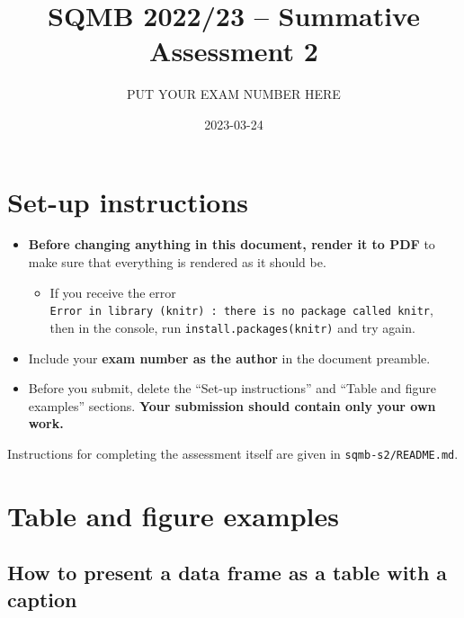 \documentclass[
]{article}
\title{SQMB 2022/23 -- Summative Assessment 2}
\author{PUT YOUR EXAM NUMBER HERE}
\date{2023-03-24}
\providecommand{\tightlist}{%
  \setlength{\itemsep}{0pt}\setlength{\parskip}{0pt}}
\begin{document}
\maketitle

{
\setcounter{tocdepth}{2}
\tableofcontents
}
\newpage

\hypertarget{set-up-instructions}{%
\section{Set-up instructions}\label{set-up-instructions}}

\begin{itemize}
\tightlist
\item
  \textbf{Before changing anything in this document, render it to PDF}
  to make sure that everything is rendered as it should be.

  \begin{itemize}
  \tightlist
  \item
    If you receive the error
    \texttt{Error\ in\ library\ (knitr)\ :\ there\ is\ no\ package\ called\ \textquotesingle{}knitr\textquotesingle{}},
    then in the console, run
    \texttt{install.packages(\textquotesingle{}knitr\textquotesingle{})}
    and try again.
  \end{itemize}
\item
  Include your \textbf{exam number as the author} in the document
  preamble.
\item
  Before you submit, delete the ``Set-up instructions'' and ``Table and
  figure examples'' sections. \textbf{Your submission should contain
  only your own work.}
\end{itemize}

Instructions for completing the assessment itself are given in
\texttt{sqmb-s2/README.md}.

\hypertarget{table-and-figure-examples}{%
\section{Table and figure examples}\label{table-and-figure-examples}}

\hypertarget{how-to-present-a-data-frame-as-a-table-with-a-caption}{%
\subsection{How to present a data frame as a table with a
caption}\label{how-to-present-a-data-frame-as-a-table-with-a-caption}}
\end{document}
